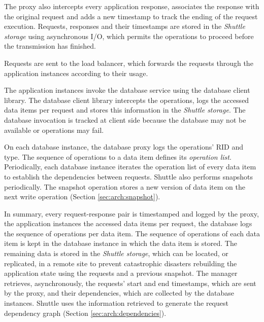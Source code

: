 The proxy also intercepts every application response, associates the response with the original request and adds a new timestamp to track the ending of the request execution. Requests, responses and their timestamps are stored in the \emph{Shuttle storage} using asynchronous I/O, which permits the operations to proceed before the transmission has finished. 

Requests are sent to the load balancer, which forwards the requests through the application instances according to their usage.


The application instances invoke the database service using the database client library. The database client library intercepts the operations, logs the accessed data items per request and stores this information in the \emph{Shuttle storage}. The database invocation is tracked at client side because the database may not be available or operations may fail.

On each database instance, the database proxy logs the operations' \ac{RID} and type. The sequence of operations to a data item defines its \emph{operation list}. Periodically, each database instance iterates the operation list of every data item to establish the dependencies between requests. Shuttle also performs snapshots periodically. The snapshot operation stores a new version of data item on the next write operation (Section \ref{sec:arch:snapshot}).


In summary, every request-response pair is timestamped and logged by the proxy, the application instances the accessed data items per request, the database logs the sequence of operations per data item. The sequence of operations of each data item is kept in the database instance in which the data item is stored. The remaining data is stored in the \emph{Shuttle storage}, which can be located, or replicated, in a remote site to prevent catastrophic disasters rebuilding the application state using the requests and a previous snapshot. The manager retrieves, asynchronously, the requests' start and end timestamps, which are sent by the proxy, and their dependencies, which are collected by the database instances. Shuttle uses the information retrieved to generate the request dependency graph (Section \ref{sec:arch:dependencies}). 






